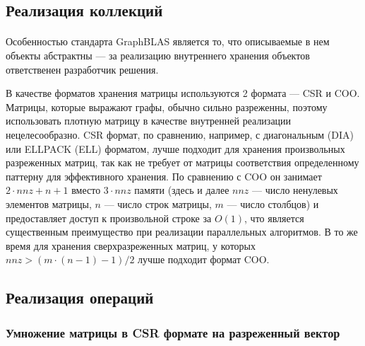 \subsection{Реализация коллекций}
\paragraph{}
Особенностью стандарта GraphBLAS является то, что описываемые в нем объекты абстрактны --- за реализацию внутреннего хранения объектов ответственен разработчик решения. 

В качестве форматов хранения матрицы используются 2 формата --- CSR и COO.
Матрицы, которые выражают графы, обычно сильно разреженны, поэтому использовать плотную матрицу в качестве внутренней реализации нецелесообразно.
CSR формат, по сравнению, например, с диагональным (DIA) или ELLPACK (ELL) форматом, лучше подходит для хранения произвольных разреженных матриц, так как не требует от матрицы соответствия определенному паттерну для эффективного хранения. По сравнению с COO он занимает $2 \cdot nnz + n + 1$ вместо $3\cdot nnz$ памяти (здесь и далее $nnz$ --- число ненулевых элементов матрицы, $n$ --- число строк матрицы, $m$ --- число столбцов) и предоставляет доступ к произвольной строке за $O(1)$, что является существенным преимущество при реализации параллельных алгоритмов. В то же время для хранения сверхразреженных матриц, у которых $nnz > (m\cdot(n-1)-1)/2$ лучше подходит формат COO.

\subsection{Реализация операций}
\subsubsection{Умножение матрицы в CSR формате на разреженный вектор}
